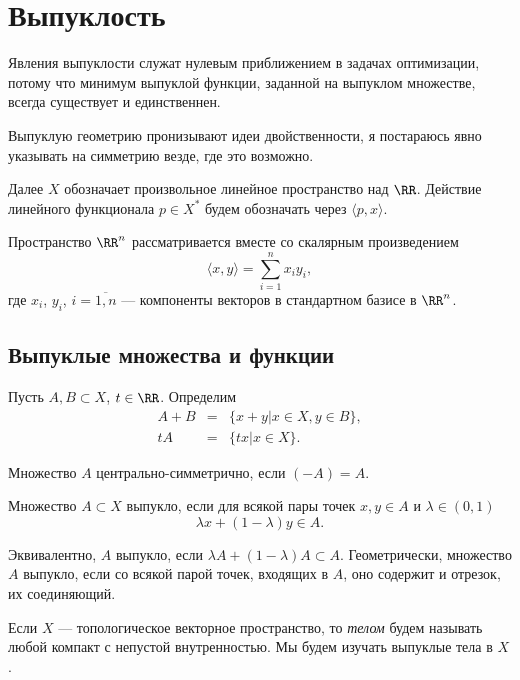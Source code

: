 \section{Выпуклость}
Явления выпуклости служат нулевым приближением в задачах оптимизации, потому что минимум выпуклой функции, заданной на выпуклом множестве, всегда существует и единственнен.

Выпуклую геометрию пронизывают идеи двойственности, я постараюсь явно указывать на симметрию везде, где это возможно.

Далее $X$ обозначает произвольное линейное пространство над $\RR$. Действие линейного функционала $p\in X^*$ будем обозначать через $\langle p,x\rangle$.

Пространство $\RR^n$ рассматривается вместе со скалярным произведением
	\begin{equation}
		\langle x,y\rangle =\sum_{i=1}^n x_iy_i,
	\end{equation}
где $x_i$, $y_i$, $i=\overline{1,n}$ --- компоненты векторов в стандартном базисе в $\RR^n$.

\subsection{Выпуклые множества и функции}
\begin{defin}
	Пусть $A,B\subset X$, $t\in\RR$. Определим
		\begin{eqnarray}
			A+B&=&\{x+y|x\in X, y\in B\},\\
			tA&=&\{tx|x\in X\}.
		\end{eqnarray}
\end{defin}
\begin{defin}
	Множество $A$ центрально-симметрично, если $(-A)=A$.
\end{defin}
\begin{defin}
	Множество $A\subset X$ выпукло, если для всякой пары точек $x,y\in A$ и $\lambda\in(0,1)$
	\begin{equation}
		\lambda x+(1-\lambda)y\in A.
	\end{equation}
\end{defin}
Эквивалентно, $A$ выпукло, если $\lambda A+(1-\lambda) A\subset A$. Геометрически, множество $A$ выпукло, если со всякой парой точек, входящих в $A$, оно содержит и отрезок, их соединяющий.

Если $X$ --- топологическое векторное пространство, то \textit{телом} будем называть любой компакт с непустой внутренностью. Мы будем изучать выпуклые тела в $X$.

